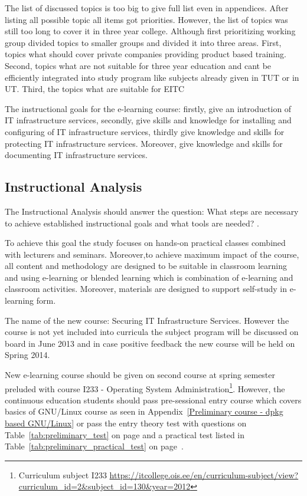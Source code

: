 The list of discussed topics is too big to give full list even in appendices. After listing all possible topic all items got priorities. However, the list of topics was still too long to cover it in three year college. Although first prioritizing working group divided topics to smaller groups and divided it into three areas. First, topics what should cover private companies providing product based training. Second, topics what are not suitable for three year education and cant be efficiently integrated into study program like subjects already given in \gls{TUT} or in \gls{UT}. Third, the topics what are suitable for \gls{EITC}

The instructional goals for the e-learning course: firstly, give an introduction of IT infrastructure services, secondly, give skills and knowledge for installing and configuring of IT infrastructure services, thirdly give knowledge and skills for protecting IT infrastructure services. Moreover, give knowledge and skills for documenting IT infrastructure services.

\subsection{Instructional Analysis}
The Instructional Analysis should answer the question: What steps are necessary to achieve  established instructional goals and what tools are needed? \citep{website:addie}.

To achieve this goal the study focuses on hands-on practical classes combined with lecturers and seminars. Moreover,to achieve maximum impact of the course, all content and methodology are designed to be suitable in classroom learning and using e-learning or blended learning which is combination of e-learning and classroom activities. Moreover, materials are designed to support self-study in e-learning form.

The name of the new course: Securing IT Infrastructure Services. However the course is not yet included into curricula the subject program will be discussed on board in June 2013 and in case positive feedback the new course will be held on Spring 2014.

New e-learning course should be given on second course at spring semester preluded with course I233 - Operating System Administration\footnote{Curriculum subject I233 \url{https://itcollege.ois.ee/en/curriculum-subject/view?curriculum_id=2&subject_id=130&year=2012}}. However, the continuous education students should pass pre-sessional entry course which covers basics of GNU/Linux course as seen in Appendix~\ref{Preliminary course - dpkg based GNU/Linux} or pass the entry theory test with questions on Table~\ref{tab:preliminary_test} on page \pageref{tab:preliminary_test} and a practical test listed in Table~\ref{tab:preliminary_practical_test} on page~\pageref{tab:preliminary_practical_test}.

